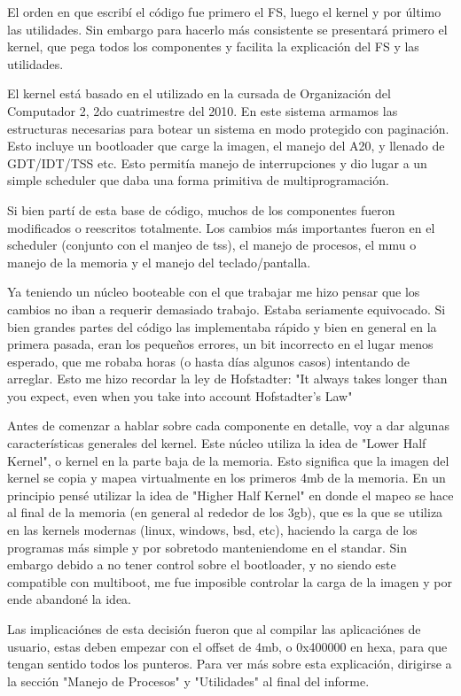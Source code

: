 El orden en que escribí el código fue primero el FS, luego el kernel y por
último las utilidades. Sin embargo para hacerlo más consistente se presentará
primero el kernel, que pega todos los componentes y facilita la explicación del
FS y las utilidades.

El kernel está basado en el utilizado en la cursada de Organización del
Computador 2, 2do cuatrimestre del 2010. En este sistema armamos las
estructuras necesarias para botear un sistema en modo protegido con paginación.
Esto incluye un bootloader que carge la imagen, el manejo del A20, y llenado de
GDT/IDT/TSS etc. Esto permitía manejo de interrupciones y dio lugar a un simple
scheduler que daba una forma primitiva de multiprogramación.

Si bien partí de esta base de código, muchos de los componentes fueron
modificados o reescritos totalmente. Los cambios más importantes fueron en el
scheduler (conjunto con el manjeo de tss), el manejo de procesos, el mmu o
manejo de la memoria y el manejo del teclado/pantalla.

Ya teniendo un núcleo booteable con el que trabajar me hizo pensar que los
cambios no iban a requerir demasiado trabajo. Estaba seriamente equivocado. Si
bien grandes partes del código las implementaba rápido y bien en general en la
primera pasada, eran los pequeños errores, un bit incorrecto en el lugar menos
esperado, que me robaba horas (o hasta días algunos casos) intentando de
arreglar. Esto me hizo recordar la ley de Hofstadter: "It always takes longer
than you expect, even when you take into account Hofstadter's Law"

Antes de comenzar a hablar sobre cada componente en detalle, voy a dar algunas
características generales del kernel. Este núcleo utiliza la idea de "Lower
Half Kernel", o kernel en la parte baja de la memoria. Esto significa que la
imagen del kernel se copia y mapea virtualmente en los primeros 4mb de la
memoria. En un principio pensé utilizar la idea de "Higher Half Kernel" en
donde el mapeo se hace al final de la memoria (en general al rededor de los
3gb), que es la que se utiliza en las kernels modernas (linux, windows, bsd,
etc), haciendo la carga de los programas más simple y por sobretodo
manteniendome en el standar. Sin embargo debido a no tener control sobre el
bootloader, y no siendo este compatible con multiboot, me fue imposible
controlar la carga de la imagen y por ende abandoné la idea.

Las implicaciónes de esta decisión fueron que al compilar las aplicaciónes de
usuario, estas deben empezar con el offset de 4mb, o 0x400000 en hexa, para que
tengan sentido todos los punteros. Para ver más sobre esta explicación,
dirigirse a la sección "Manejo de Procesos" y "Utilidades" al final del
informe.

